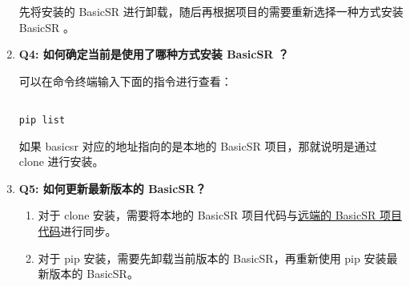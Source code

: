 \documentclass[../main.tex]{subfiles}
\begin{document}
\begin{enumerate}
\begin{verbatim}
\end{verbatim}

    先将安装的 BasicSR 进行卸载，随后再根据项目的需要重新选择一种方式安装 BasicSR 。

    \item \textbf{Q4: 如何确定当前是使用了哪种方式安装 BasicSR ？}

可以在命令终端输入下面的指令进行查看：
\begin{verbatim}

pip list

\end{verbatim}

    如果 basicsr 对应的地址指向的是本地的 BasicSR 项目，那就说明是通过 clone 进行安装。

    \item \textbf{Q5: 如何更新最新版本的 BasicSR？}

\begin{enumerate}
    \item 对于 clone 安装，需要将本地的 BasicSR 项目代码与\href{https://github.com/XPixelGroup/BasicSR}{远端的 BasicSR 项目代码}进行同步。
    \item 对于 pip 安装，需要先卸载当前版本的 BasicSR，再重新使用 pip 安装最新版本的 BasicSR。
\end{enumerate}



\end{enumerate}
\end{document}
